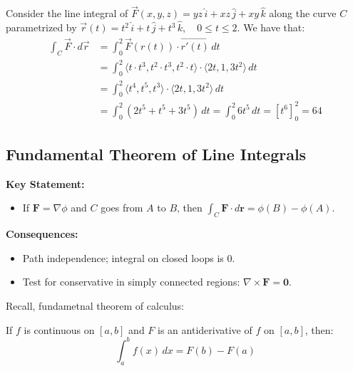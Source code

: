 \documentclass[11pt]{report}
\begin{document}
\begin{example}
    Consider the line integral of $\vec{F}(x, y, z) = yz \, \hat{i} + xz \, \hat{j} + xy \, \hat{k}$ along the curve $C$ parametrized by $ \vec{r}(t) = t^2 \, \hat{i} + t \, \hat{j} + t^3 \, \hat{k}, \quad 0 \leq t \leq 2 $. We have that:
    \begin{align*}
        \int_C \vec{F} \cdot d\vec{r} &= \int_0^2 \vec{F}(r(t)) \cdot \vec{r'(t)} \, dt \\
        &= \int_0^2 \langle t \cdot t^3, t^2 \cdot t^3, t^2 \cdot t \rangle \cdot \langle 2t, 1, 3t^2 \rangle \, dt \\
        &= \int_0^2 \langle t^4, t^5, t^3 \rangle \cdot \langle 2t, 1, 3t^2 \rangle \, dt \\
        &= \int_0^2 (2t^5 + t^5 + 3t^5) \, dt = \int_0^2 6t^5 \, dt = \left[ t^6 \right]_0^2 = 64
    \end{align*}
\end{example}

\subsection{Fundamental Theorem of Line Integrals}

\begin{keybox}
	\textbf{Key Statement:}
\begin{itemize}
    \item If $\mathbf F=\nabla \phi$ and $C$ goes from $A$ to $B$, then $\displaystyle \int_C \mathbf F\cdot d\mathbf r = \phi(B)-\phi(A)$.
\end{itemize}
	\textbf{Consequences:}
\begin{itemize}
    \item Path independence; integral on closed loops is $0$.
    \item Test for conservative in simply connected regions: $\nabla\times\mathbf F=\mathbf 0$.
\end{itemize}
\end{keybox}
\begin{shaded}
Recall, fundametnal theorem of calculus:
\begin{theorem}
    If $f$ is continuous on $[a,b]$ and $F$ is an antiderivative of $f$ on $[a,b]$, then:
    \begin{equation}
        \int_a^b f(x) \, dx = F(b) - F(a)
    \end{equation}
\end{theorem}
\end{shaded}
\end{document}
